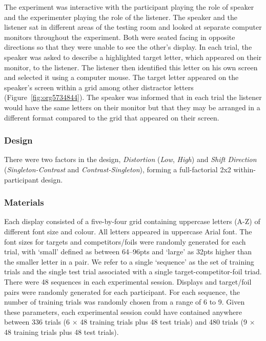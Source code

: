 \documentclass[natbib,doc,a4paper]{apa6}
\begin{document}
The experiment was interactive with the participant playing the role of speaker and the experimenter playing the role of the listener. The speaker and the listener sat in different areas of the testing room and looked at separate computer monitors throughout the experiment. Both were seated facing in opposite directions so that they were unable to see the other's display. In each trial, the speaker was asked to describe a highlighted target letter, which appeared on their monitor, to the listener. The listener then identified this letter on his own screen and selected it using a computer mouse. The target letter appeared on the speaker’s screen within a grid among other distractor letters (Figure~\ref{fig:org5734844}). The speaker was informed that in each trial the listener would have the same letters on their monitor but that they may be arranged in a different format compared to the grid that appeared on their screen.

\subsubsection*{Design}
\label{sec:orgd554469}

There were two factors in the design, \emph{Distortion} (\emph{Low}, \emph{High}) and \emph{Shift Direction} (\emph{Singleton-Contrast} and \emph{Contrast-Singleton}), forming a full-factorial 2x2 within-participant design.

\subsubsection*{Materials}
\label{sec:org064b298}

Each display consisted of a five-by-four grid containing uppercase letters (A-Z) of different font size and colour. All letters appeared in uppercase Arial font. The font sizes for targets and competitors/foils were randomly generated for each trial, with `small' defined as between 64--96pts and `large' as 32pts higher than the smaller letter in a pair.  We refer to a single `sequence' as the set of training trials and the single test trial associated with a single target-competitor-foil triad. There were 48 sequences in each experimental session. Displays and target/foil pairs were randomly generated for each participant. For each sequence, the number of training trials was randomly chosen from a range of 6 to 9. Given these parameters, each experimental session could have contained anywhere between 336 trials (6 \(\times\) 48 training trials plus 48 test trials) and 480 trials (9 \(\times\) 48 training trials plus 48 test trials).  
\end{document}
